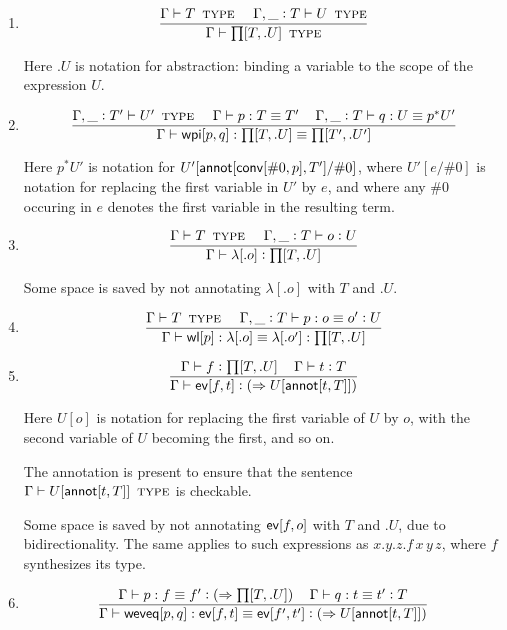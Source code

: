 \documentclass[11pt]{article}
\newcommand{\eqd}{\equiv}
\newcommand{\spc}{{\,\,\,\,\,\,\,}}
\newcommand{\ccolon}[1]{\vcentcolon#1}
\newcommand{\synth}[1]{\vcentcolon(\Rightarrow#1)} %
\newcommand{\ccheck}[1]{\vcentcolon#1}  %
\newcommand{\Type}{\mathop{\text{ \sc type}}}
\newcommand{\ha}[2]{#1[#2]}
\newcommand{\annot}{{\sf annot}}
\newcommand{\conv}{{\sf conv}}
\newcommand{\ev}{{\sf ev}}
\newcommand{\weveq}{{\sf weveq}}
\newcommand{\wl}{{\sf wl}}
\newcommand{\wpi}{{\sf wpi}}
\newcommand{\var}{\char`_}
\begin{document}
\begin{enumerate}

\item 
$$\frac{\Gamma \vdash T \Type \spc \Gamma, \var \ccolon{T}\vdash U\Type}{\Gamma\vdash \ha\prod{T,.U}\Type}$$

Here $.U$ is notation for abstraction: binding a variable to the scope of the expression $U$.

\item 
$$ \frac{ 
  \Gamma, \var \ccolon{T'} \vdash U'  \Type      \spc 
  \Gamma     \vdash p:T \eqd T'    \spc
  \Gamma,  \var \ccolon{T}  \vdash q:U \eqd p^*U'
  } {
  \Gamma     \vdash \ha\wpi{p,q}:\ha\prod{T,.U}\eqd \ha\prod{T',.U'}
}$$

Here ${p}^*U'$ is notation for $U'[\ha\annot{\ha\conv{\#0,p},T'}/\#0]$, where
$U'[e/\#0]$ is notation for replacing the first variable in $U'$ by $e$, and
where any $\#0$ occuring in $e$ denotes the first variable in the resulting
term.

\item 
$$\frac{\Gamma \vdash T \Type \spc \Gamma, \var \ccolon{T}\vdash o \ccheck{U}}{\Gamma\vdash \ha\lambda{.o} \ccheck{\ha\prod{T,.U}}}$$

Some space is saved by not annotating $\ha\lambda{.o}$ with $T$ and $.U$.

\item 
$$\frac{\Gamma \vdash T \Type \spc \Gamma, \var \ccolon{T}\vdash p : o\eqd o' \ccheck{U}}{\Gamma\vdash \ha\wl{p} : \ha\lambda{.o}\eqd \ha\lambda{.o'} : \ha\prod{T,.U}}$$

\item 
$$\frac{\Gamma\vdash f \ccolon{\ha\prod{T,.U}}\spc \Gamma\vdash t \ccheck{T}}{\Gamma\vdash \ha\ev{f,t} \synth{U[\ha\annot{t,T}]}}$$

Here $U[o]$ is notation for replacing the first variable of $U$ by $o$, with
the second variable of $U$ becoming the first, and so on.  

The annotation is present to ensure that the sentence $\Gamma \vdash
U[\ha\annot{t,T}] \Type$ is checkable.

Some space is saved by not annotating $\ha\ev{f,o}$ with $T$ and $.U$, due to
bidirectionality.  The same applies to such expressions as $x.y.z.f\, x\, y\,
z$, where $f$ synthesizes its type.

\item 
$$\frac{
   \Gamma\vdash p : f \eqd f' \synth{\ha\prod{T,.U}}\spc 
   \Gamma\vdash q : t \eqd t' \ccheck{T}
   }{
   \Gamma\vdash \ha\weveq{p,q} : \ha\ev{f,t} \eqd \ha\ev{f',t'} \synth{U[\ha\annot{t,T}]}
  }$$


\end{enumerate}
\end{document}
